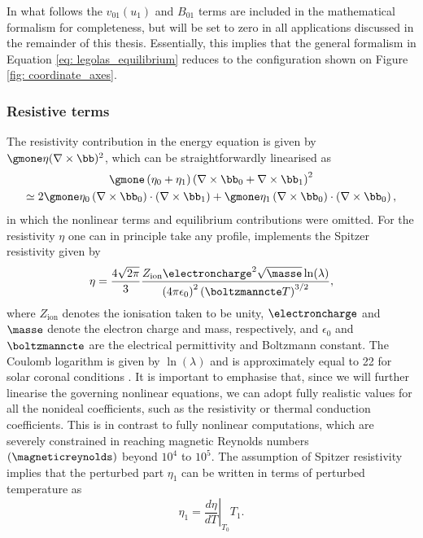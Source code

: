 In what follows the $v_{01}(u_1)$ and $B_{01}$ terms are included in the mathematical formalism for completeness, but will be set to zero in all applications discussed in the remainder of this thesis. Essentially, this implies that the general formalism in Equation \eqref{eq: legolas_equilibrium} reduces to the configuration shown on Figure \ref{fig: coordinate_axes}.

\subsubsection{Resistive terms}
The resistivity contribution in the energy equation is given by $\gmone \eta (\nabla \times \bb)^2$, which can be straightforwardly linearised as
\begin{equation}
  \begin{gathered}
    \gmone\left(\eta_0 + \eta_1\right)\left(\nabla \times \bb_0 + \nabla \times \bb_1\right)^2 \\
    \simeq 2\gmone \eta_0 \left(\nabla \times \bb_0\right) \cdot \left(\nabla \times \bb_1\right)
      + \gmone\eta_1 \left(\nabla \times \bb_0\right) \cdot \left(\nabla \times \bb_0\right),
  \end{gathered}
\end{equation}
in which the nonlinear terms and equilibrium contributions were omitted. For the resistivity $\eta$ one can in principle take any profile, {\legolas} implements the Spitzer resistivity given by
\begin{equation} \label{eq: spitzer_eta}
  \eta = \frac{4\sqrt{2\pi}}{3}\frac{
    Z_\text{ion} \electroncharge^2 \sqrt{\masse} \ln(\lambda)
  }{
    \left(4\pi\epsilon_0\right)^2\left(\boltzmanncte T\right)^{3/2}
  },
\end{equation}
where $Z_\text{ion}$ denotes the ionisation taken to be unity, $\electroncharge$ and $\masse$ denote the electron charge and mass, respectively, and $\epsilon_0$ and $\boltzmanncte$ are the electrical permittivity and Boltzmann constant. The Coulomb logarithm is given by $\ln(\lambda)$ and is approximately equal to 22 for solar coronal conditions \citep{book_MHD}. It is important to emphasise that, since we will further linearise the governing nonlinear equations, we can adopt fully realistic values for all the nonideal coefficients, such as the resistivity or thermal conduction coefficients. This is in contrast to fully nonlinear computations, which are severely constrained in reaching magnetic Reynolds numbers $\left(\magneticreynolds\right)$ beyond $10^4$ to $10^5$. The assumption of Spitzer resistivity implies that the perturbed part $\eta_1$ can be written in terms of perturbed temperature as
\begin{equation}
  \eta_1 = \left.\frac{d\eta}{dT}\right|_{T_0}T_1.
\end{equation}

